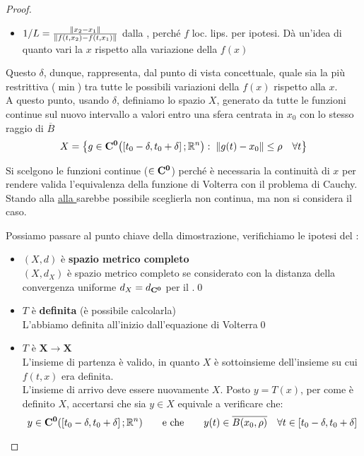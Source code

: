 \begin{theorem}
\begin{proof}
\begin{itemize}
			\item $1/L = \frac{\left\|x_2-x_1\right\|}{\left\|f(t,x_2)-f(t,x_1)\right\|}$ dalla , perché $f$ loc. lips. per ipotesi. Dà un'idea di quanto vari la $x$ rispetto alla variazione della $f(x)$
		\end{itemize}
		Questo $\delta$, dunque, rappresenta, dal punto di vista concettuale, quale sia la più restrittiva ($\min$) tra tutte le possibili variazioni della $f(x)$ rispetto alla $x$.\\
		A questo punto, usando $\delta$, definiamo lo spazio $X$, generato da tutte le funzioni continue sul nuovo intervallo a valori entro una sfera centrata in $x_0$ con lo stesso raggio di $\overline{B}$
		\[X = \left\{g\in \mathbf{C^{0}} \bigl( \left[t_0-\delta,t_0+\delta\right];\mathbb{R}^n \bigr):\; \left\|g(t)-x_0\right\|\leq \rho \quad \forall t\right\}\]
		\vspace*{-\baselineskip}
		\begin{note}
			Si scelgono le funzioni continue ($\in \mathbf{C^{0}}$) perché è necessaria la continuità di $x$ per rendere valida l'equivalenza della funzione di Volterra con il problema di Cauchy. Stando alla \hyperlink{note:volterra_non_cont}{\notestyle{} alla } sarebbe possibile sceglierla non continua, ma non si considera il caso.
		\end{note}
		Possiamo passare al punto chiave della dimostrazione, verifichiamo le ipotesi del :
		\begin{itemize}
			\item $(X,d)$ è \textbf{spazio metrico completo}\\
			$(X,d_X)$ è spazio metrico completo se considerato con la distanza della convergenza uniforme $d_X = d_{\mathbf{C^{0}}}$ per il .\qed
			\item $T$ è \textbf{definita} (è possibile calcolarla)\\
			L'abbiamo definita all'inizio dall'equazione di Volterra\qed
			\item $T$ è $\boldsymbol{X \to X}$\\
			L'insieme di partenza è valido, in quanto $X$ è sottoinsieme dell'insieme su cui $f(t,x)$ era definita.\\
			L'insieme di arrivo deve essere nuovamente $X$. Posto $y=T(x)$, per come è definito $X$, accertarsi che sia $y \in X$ equivale a verificare che:
			\[
				y \in \mathbf{C^{0}}(\left[t_0-\delta,t_0+\delta\right];\mathbb{R}^n)
				\qquad \text{e che} \qquad
				y(t)\in \overline{B(x_0,\rho)} \quad \forall t \in \left[t_0-\delta,t_0+\delta\right]
\]
\end{itemize}
\end{proof}
\end{theorem}

